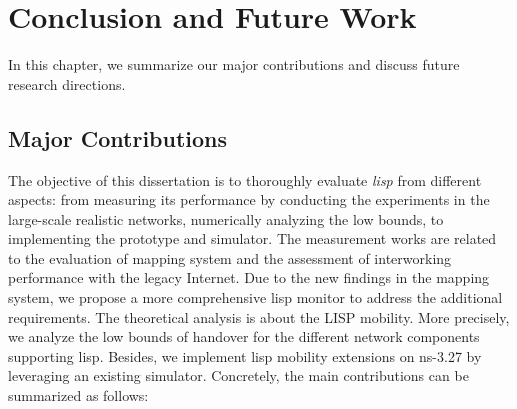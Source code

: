 
\chapter{Conclusion and Future Work}
\label{cha:conclusion}
In this chapter, we summarize our major contributions and discuss future research directions.

\section{Major Contributions}
The objective of this dissertation is to thoroughly evaluate \emph{\acrfull{lisp}} from different aspects: from measuring its performance by conducting the experiments in the large-scale realistic networks, numerically analyzing the low bounds, to implementing the prototype and simulator. The measurement works are related to the evaluation of mapping system and the assessment of interworking performance with the legacy Internet. Due to the new findings in the mapping system, we propose a more comprehensive \acrshort{lisp} monitor to address the additional requirements. The theoretical analysis is about the LISP mobility. More precisely, we analyze the low bounds of handover for the different network components supporting \acrshort{lisp}. Besides, we implement \acrshort{lisp} mobility extensions on ns-3.27 by leveraging an existing simulator. Concretely, the main contributions can be summarized as follows:

